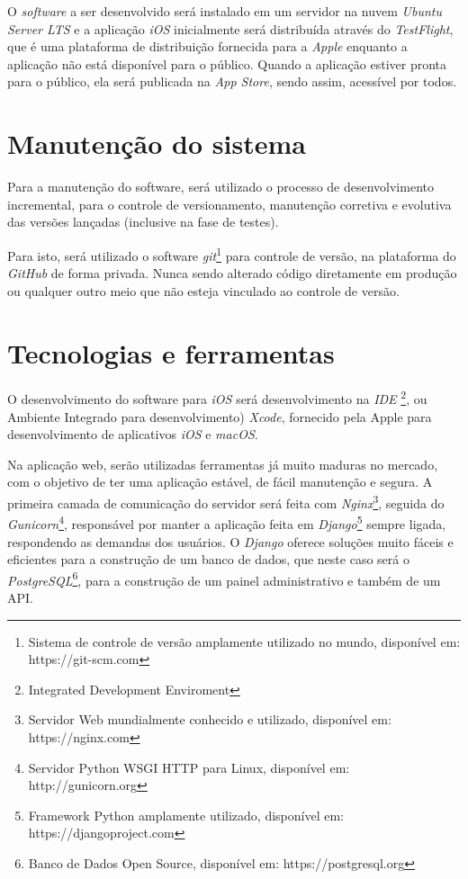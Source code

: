 \documentclass[
	12pt,
	oneside,
	a4paper,
	english,
	brazil,
]{abntex2}
\begin{document}
O \emph{software} a ser desenvolvido será instalado em um servidor na nuvem \emph{Ubuntu Server LTS} e a aplicação \emph{iOS} inicialmente será distribuída através do \emph{TestFlight}, que é uma plataforma de distribuição fornecida para a \emph{Apple} enquanto a aplicação não está disponível para o público. Quando a aplicação estiver pronta para o público, ela será publicada na \emph{App Store}, sendo assim, acessível por todos.

\section{Manutenção do sistema}

Para a manutenção do software, será utilizado o processo de desenvolvimento incremental, para o controle de versionamento, manutenção corretiva e evolutiva das versões lançadas (inclusive na fase de testes).

Para isto, será utilizado o software \emph{git}\footnote{Sistema de controle de versão amplamente utilizado no mundo, disponível em: https://git-scm.com} para controle de versão, na plataforma do \emph{GitHub} de forma privada. Nunca sendo alterado código diretamente em produção ou qualquer outro meio que não esteja vinculado ao controle de versão.

\section{Tecnologias e ferramentas}

O desenvolvimento do software para \emph{iOS} será desenvolvimento na \emph{IDE} \footnote{Integrated Development Enviroment}, ou Ambiente Integrado para desenvolvimento) \emph{Xcode}, fornecido pela Apple para desenvolvimento de aplicativos \emph{iOS} e \emph{macOS}.

Na aplicação web, serão utilizadas ferramentas já muito maduras no mercado, com o objetivo de ter uma aplicação estável, de fácil manutenção e segura. A primeira camada de comunicação do servidor será feita com \emph{Nginx}\footnote{Servidor Web mundialmente conhecido e utilizado, disponível em: https://nginx.com}, seguida do \emph{Gunicorn}\footnote{Servidor Python WSGI HTTP para Linux, disponível em: http://gunicorn.org}, responsável por manter a aplicação feita em \emph{Django}\footnote{Framework Python amplamente utilizado, disponível em: https://djangoproject.com} sempre ligada, respondendo as demandas dos usuários. O \emph{Django} oferece soluções muito fáceis e eficientes para a construção de um banco de dados, que neste caso será o \emph{PostgreSQL}\footnote{Banco de Dados Open Source, disponível em: https://postgresql.org}, para a construção de um painel administrativo e também de um API.
\end{document}
